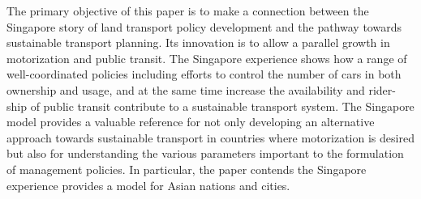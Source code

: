 The primary objective of this paper is to make a connection between the Singapore story of land transport policy development and the pathway towards sustainable transport planning. Its innovation is to allow a parallel growth in motorization and public transit. The Singapore experience shows how a range of well-coordinated policies including efforts to control the number of cars in both ownership and usage, and at the same time increase the availability and rider-ship of public transit contribute to a sustainable transport system. The Singapore model provides a valuable reference for not only developing an alternative approach towards sustainable transport in countries where motorization is desired but also for understanding the various parameters important to the formulation of management policies. In particular, the paper contends the Singapore experience provides a model for Asian nations and cities.
